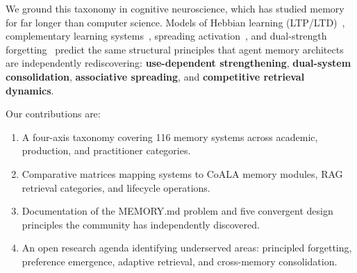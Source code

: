 We ground this taxonomy in cognitive neuroscience, which has studied
memory for far longer than computer science. Models of Hebbian learning
(LTP/LTD)~\cite{hebb1949, bliss1973}, complementary learning
systems~\cite{mcclelland1995}, spreading activation~\cite{collins1975},
and dual-strength forgetting~\cite{bjork1992} predict the same
structural principles that agent memory architects are independently
rediscovering: \textbf{use-dependent strengthening}, \textbf{dual-system
consolidation}, \textbf{associative spreading}, and \textbf{competitive
retrieval dynamics}.

Our contributions are:
\begin{enumerate}[leftmargin=*, nosep]
    \item A four-axis taxonomy covering 116 memory systems across
    academic, production, and practitioner categories.
    \item Comparative matrices mapping systems to CoALA memory
    modules, RAG retrieval categories, and lifecycle operations.
    \item Documentation of the MEMORY.md problem and five convergent
    design principles the community has independently discovered.
    \item An open research agenda identifying underserved areas:
    principled forgetting, preference emergence, adaptive retrieval,
    and cross-memory consolidation.
\end{enumerate}
